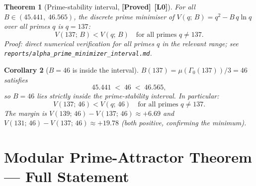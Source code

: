 \documentclass[12pt,a4paper]{article}
\newtheorem{theorem}{Theorem}[section]
\newtheorem{corollary}[theorem]{Corollary}
\theoremstyle{definition}
\theoremstyle{remark}
\newcommand{\PROVED}{\textbf{[Proved]}}
\newcommand{\Lzero}{\textbf{[L0]}}
\begin{document}
\begin{theorem}[Prime-stability interval, \PROVED\ \Lzero]
\label{thm:mpat:interval}
For all $B \in (45.441,\;46.565)$, the discrete prime minimiser of
$V(q;\,B) = q^2 - B\,q\ln q$ over all primes $q$ is $q = 137$:
\begin{equation}
  V(137;\,B) < V(q;\,B)
  \quad\text{for all primes }q \neq 137.
  \label{eq:mpat:prime_min}
\end{equation}
Proof: direct numerical verification for all primes $q$ in the relevant range;
see \texttt{reports/alpha\_prime\_minimizer\_interval.md}.
\end{theorem}

\begin{corollary}[$B = 46$ is inside the interval]
\label{cor:mpat:B46}
$B(137) = \mu(\Gamma_0(137))/3 = 46$ satisfies
\begin{equation}
  45.441 \;<\; 46 \;<\; 46.565,
  \label{eq:mpat:46_inside}
\end{equation}
so $B = 46$ lies strictly inside the prime-stability interval.  In particular:
\begin{equation}
  V(137;\,46) < V(q;\,46)
  \quad\text{for all primes }q \neq 137.
  \label{eq:mpat:46_min}
\end{equation}
The margin is $V(139;\,46) - V(137;\,46) \approx +6.69$ and
$V(131;\,46) - V(137;\,46) \approx +19.78$ (both positive, confirming the minimum).
\end{corollary}

\section{Modular Prime-Attractor Theorem — Full Statement}
\label{sec:mpat:theorem}
\end{document}
